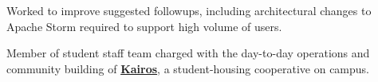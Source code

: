 \documentclass[letterpaper]{deedy-resume} %
\begin{document}
\begin{minipage}[t]{0.66\textwidth}
\sectionspace %



\begin{tightitemize}
\item Worked to improve suggested followups, including architectural changes to Apache Storm required to support high volume of users.
\end{tightitemize}

\sectionspace %



\begin{tightitemize}
\item Member of student staff team charged with the day-to-day operations and community building of \textbf{\href{http://web.stanford.edu/group/kairos/}{Kairos}}, a student-housing cooperative on campus.


\end{tightitemize}








\end{minipage}
\end{document}
